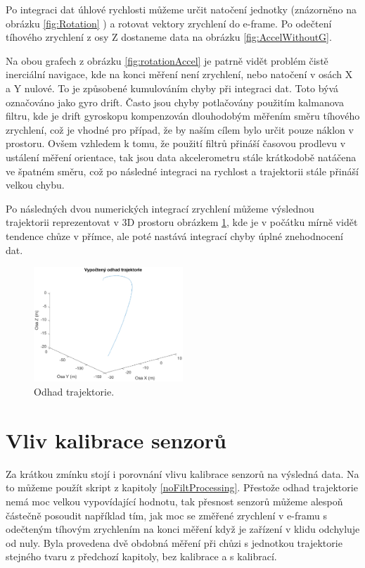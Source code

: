 Po integraci dat úhlové rychlosti můžeme určit natočení jednotky (znázorněno na obrázku \ref{fig:Rotation} ) a rotovat vektory zrychlení do e-frame. Po odečtení tíhového zrychlení z osy Z dostaneme data na obrázku \ref{fig:AccelWithoutG}.

Na obou grafech z obrázku \ref{fig:rotationAccel} je patrně vidět problém čistě inerciální navigace, kde na konci měření není zrychlení, nebo natočení v osách X a Y nulové. To je způsobené kumulováním chyby při integraci dat. Toto bývá označováno jako gyro drift. Často jsou chyby potlačovány použitím kalmanova filtru, kde je drift gyroskopu kompenzován dlouhodobým měřením směru tíhového zrychlení, což je vhodné pro případ, že by naším cílem bylo určit pouze náklon v prostoru. Ovšem vzhledem k tomu, že použití filtrů přináší časovou prodlevu v ustálení měření orientace, tak jsou data akcelerometru stále krátkodobě natáčena ve špatném směru, což po následné integraci na rychlost a trajektorii stále přináší velkou chybu.

Po následných dvou numerických integrací zrychlení můžeme výslednou trajektorii reprezentovat v 3D prostoru obrázkem \ref{fig:Trajectory}, kde je v počátku mírně vidět tendence chůze v přímce, ale poté nastává integrací chyby úplné znehodnocení dat. 

\begin{figure}[h]
     \centering
         \includegraphics[width=0.5\textwidth]{obrazky/matlab/1measTraj}
         \caption{Odhad trajektorie.}
        \label{fig:Trajectory}
\end{figure}

\section{Vliv kalibrace senzorů}
Za krátkou zmínku stojí i porovnání vlivu kalibrace senzorů na výsledná data. Na to můžeme použít skript z kapitoly \ref{noFiltProcessing}. Přestože odhad trajektorie nemá moc velkou vypovídající hodnotu, tak přesnost senzorů můžeme alespoň částečně posoudit například tím, jak moc se změřené zrychlení v e-framu s odečteným tíhovým zrychlením na konci měření když je zařízení v klidu odchyluje od nuly. Byla provedena dvě obdobná měření při chůzi s jednotkou trajektorie stejného tvaru z předchozí kapitoly, bez kalibrace a s kalibrací.

